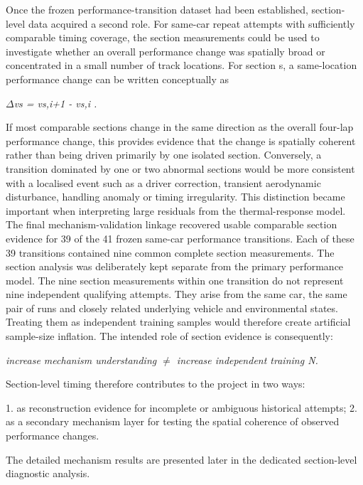 Once the frozen performance-transition dataset had been established, section-level data acquired a second role. For same-car repeat attempts with sufficiently comparable timing coverage, the section measurements could be used to investigate whether an overall performance change was spatially broad or concentrated in a small number of track locations. For section s, a same-location performance change can be written conceptually as

\begin{center}\textit{\ensuremath{\Delta}vs = vs,i+1 - vs,i .}\end{center}

If most comparable sections change in the same direction as the overall four-lap performance change, this provides evidence that the change is spatially coherent rather than being driven primarily by one isolated section. Conversely, a transition dominated by one or two abnormal sections would be more consistent with a localised event such as a driver correction, transient aerodynamic disturbance, handling anomaly or timing irregularity. This distinction became important when interpreting large residuals from the thermal-response model. The final mechanism-validation linkage recovered usable comparable section evidence for 39 of the 41 frozen same-car performance transitions. Each of these 39 transitions contained nine common complete section measurements. The section analysis was deliberately kept separate from the primary performance model. The nine section measurements within one transition do not represent nine independent qualifying attempts. They arise from the same car, the same pair of runs and closely related underlying vehicle and environmental states. Treating them as independent training samples would therefore create artificial sample-size inflation. The intended role of section evidence is consequently:

\begin{center}\textit{increase mechanism understanding \ensuremath{\neq} increase independent training N.}\end{center}

Section-level timing therefore contributes to the project in two ways:

1. as reconstruction evidence for incomplete or ambiguous historical attempts; 2. as a secondary mechanism layer for testing the spatial coherence of observed performance changes.

The detailed mechanism results are presented later in the dedicated section-level diagnostic analysis.

